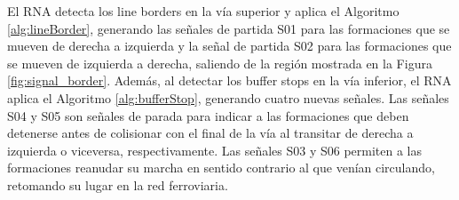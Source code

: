     El RNA detecta los line borders en la vía superior y aplica el Algoritmo \ref{alg:lineBorder}, generando las señales de partida S01 para las formaciones que se mueven de derecha a izquierda y la señal de partida S02 para las formaciones que se mueven de izquierda a derecha, saliendo de la región mostrada en la Figura \ref{fig:signal_border}. Además, al detectar los buffer stops en la vía inferior, el RNA aplica el Algoritmo \ref{alg:bufferStop}, generando cuatro nuevas señales. Las señales S04 y S05 son señales de parada para indicar a las formaciones que deben detenerse antes de colisionar con el final de la vía al transitar de derecha a izquierda o viceversa, respectivamente. Las señales S03 y S06 permiten a las formaciones reanudar su marcha en sentido contrario al que venían circulando, retomando su lugar en la red ferroviaria.